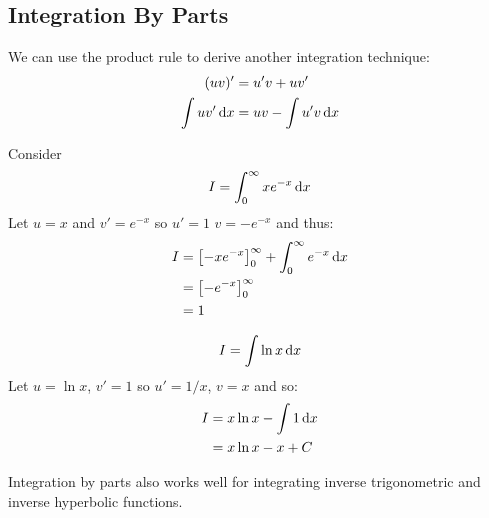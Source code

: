 \documentclass[../main.tex]{subfiles}
\begin{document}
\subsection{Integration By Parts}
We can use the product rule to derive another integration technique:
\begin{align*}
  (uv)' &= u'v + uv' \\
  \int uv' \,\mathrm{d} x &= uv - \int u'v \,\mathrm{d} x
\end{align*}
\begin{example}
  Consider
  \[
    I =\int_{0}^{\infty} xe^{-x} \,\mathrm{d} x
  \]
  Let $u=x$ and $v'=e^{-x}$ so $u'=1$ $v=-e^{-x}$ and thus:
  \begin{align*}
    I &= \left[-xe^{-x}\right]_{0}^{\infty} + \int_{0}^{\infty} e^{-x} \,\mathrm{d} x \\
      &= \left[-e^{-x}\right]_{0}^{\infty} \\
      &= 1
  \end{align*}
\end{example}
\begin{example}
  \[
    I = \int \ln x \,\mathrm{d} x
  \]
  Let $u = \ln x$, $v' = 1$ so $u' = 1/x$, $v = x$ and so:
  \begin{align*}
    I &= x \ln x - \int 1 \,\mathrm{d} x \\
      &= x \ln x - x + C
  \end{align*}
\end{example}
Integration by parts also works well for integrating inverse trigonometric and inverse hyperbolic functions.
\end{document}
